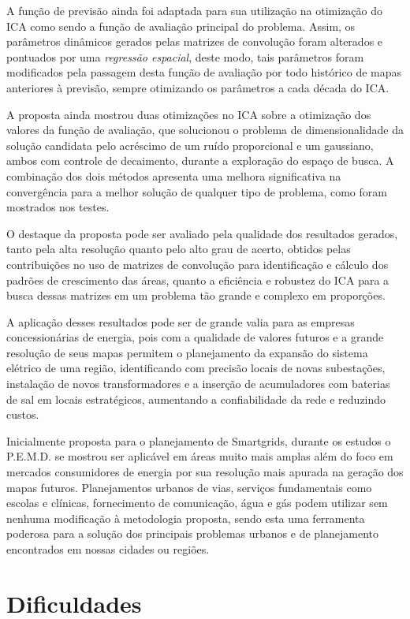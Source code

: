 A função de previsão ainda foi adaptada para sua utilização na otimização do ICA como sendo a função de avaliação principal do problema. Assim, os parâmetros dinâmicos gerados pelas matrizes de convolução foram alterados e pontuados por uma \emph{regressão espacial}, deste modo, tais parâmetros foram modificados pela passagem desta função de avaliação por todo histórico de mapas anteriores à previsão, sempre otimizando os parâmetros a cada década do ICA. 

A proposta ainda mostrou duas otimizações no ICA sobre a otimização dos valores da função de avaliação, que solucionou o problema de dimensionalidade da solução candidata pelo acréscimo de um ruído proporcional e um gaussiano, ambos com controle de decaimento, durante a exploração do espaço de busca. A combinação dos dois métodos apresenta uma melhora significativa na convergência para a melhor solução de qualquer tipo de problema, como foram mostrados nos testes. 

O destaque da proposta pode ser avaliado pela qualidade dos resultados gerados, tanto pela alta resolução quanto pelo alto grau de acerto, obtidos pelas contribuições no uso de matrizes de convolução para identificação e cálculo dos padrões de crescimento das áreas, quanto a eficiência e robustez do ICA para a busca dessas matrizes em um problema tão grande e complexo em proporções.

A aplicação desses resultados pode ser de grande valia para as empresas concessionárias de energia, pois com a qualidade de valores futuros e a grande resolução de seus mapas permitem o planejamento da expansão do sistema elétrico de uma região, identificando com precisão locais de novas subestações, instalação de novos transformadores e a inserção de acumuladores com baterias de sal em locais estratégicos, aumentando a confiabilidade da rede e reduzindo custos.

Inicialmente proposta para o planejamento de Smartgrids, durante os estudos o P.E.M.D. se mostrou ser aplicável em áreas muito mais amplas além do foco em mercados consumidores de energia por sua resolução mais apurada na geração dos mapas futuros. Planejamentos urbanos de vias, serviços fundamentais como escolas e clínicas, fornecimento de comunicação, água e gás podem utilizar sem nenhuma modificação à metodologia proposta, sendo esta uma ferramenta poderosa para a solução dos principais problemas urbanos e de planejamento encontrados em nossas cidades ou regiões. 

\section{Dificuldades}

